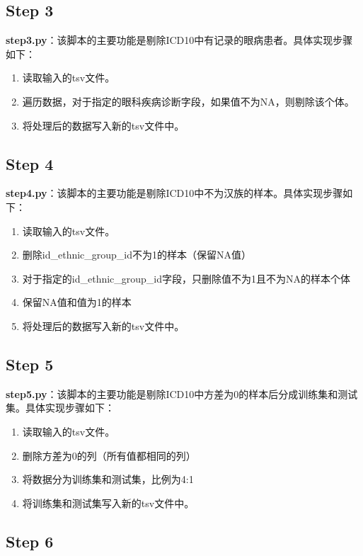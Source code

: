 \documentclass[UTF8]{report}
\theoremstyle{MyLineTheoremStyle} %
\theoremstyle{MyBlockTheoremStyle} %
\theoremstyle{MySubsubsectionStyle} %
\begin{document}
\subsection*{Step 3}

\textbf{step3.py}：该脚本的主要功能是剔除ICD10中有记录的眼病患者。具体实现步骤如下：
\begin{enumerate}
    \item 读取输入的tsv文件。
    \item 遍历数据，对于指定的眼科疾病诊断字段，如果值不为NA，则剔除该个体。
    \item 将处理后的数据写入新的tsv文件中。
\end{enumerate}

\subsection*{Step 4}

\textbf{step4.py}：该脚本的主要功能是剔除ICD10中不为汉族的样本。具体实现步骤如下：
\begin{enumerate}
    \item 读取输入的tsv文件。
    \item 删除id\_ethnic\_group\_id不为1的样本（保留NA值）
    \item 对于指定的id\_ethnic\_group\_id字段，只删除值不为1且不为NA的样本个体
    \item 保留NA值和值为1的样本
    \item 将处理后的数据写入新的tsv文件中。
\end{enumerate}

\subsection*{Step 5}

\textbf{step5.py}：该脚本的主要功能是剔除ICD10中方差为0的样本后分成训练集和测试集。具体实现步骤如下：
\begin{enumerate}
    \item 读取输入的tsv文件。
    \item 删除方差为0的列（所有值都相同的列）
    \item 将数据分为训练集和测试集，比例为4:1
    \item 将训练集和测试集写入新的tsv文件中。
\end{enumerate}

\subsection*{Step 6}
\end{document}
